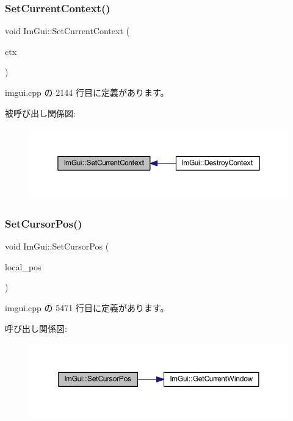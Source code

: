 \subsubsection{\texorpdfstring{Set\+Current\+Context()}{SetCurrentContext()}}
{\footnotesize\ttfamily void Im\+Gui\+::\+Set\+Current\+Context (\begin{DoxyParamCaption}\item[{\mbox{\hyperlink{struct_im_gui_context}{Im\+Gui\+Context}} $\ast$}]{ctx }\end{DoxyParamCaption})}



 imgui.\+cpp の 2144 行目に定義があります。

被呼び出し関係図\+:\nopagebreak
\begin{figure}[H]
\begin{center}
\leavevmode
\includegraphics[width=350pt]{namespace_im_gui_a289dbbbffdadcf1231821d97a7c4a9be_icgraph}
\end{center}
\end{figure}
\mbox{\label{namespace_im_gui_a51ea13c986360d8a2e868dc9eeac2115}} 
\subsubsection{\texorpdfstring{Set\+Cursor\+Pos()}{SetCursorPos()}}
{\footnotesize\ttfamily void Im\+Gui\+::\+Set\+Cursor\+Pos (\begin{DoxyParamCaption}\item[{const \mbox{\hyperlink{struct_im_vec2}{Im\+Vec2}} \&}]{local\+\_\+pos }\end{DoxyParamCaption})}



 imgui.\+cpp の 5471 行目に定義があります。

呼び出し関係図\+:\nopagebreak
\begin{figure}[H]
\begin{center}
\leavevmode
\includegraphics[width=350pt]{namespace_im_gui_a51ea13c986360d8a2e868dc9eeac2115_cgraph}
\end{center}
\end{figure}
\mbox{\label{namespace_im_gui_a8f56616f8d0b35e6e756c0b7f198ac0f}} 
